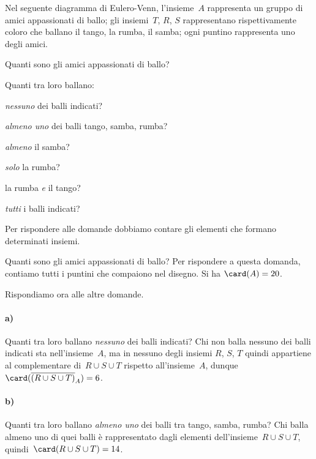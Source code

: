 \begin{exrig}
 \begin{esempio}
Nel seguente diagramma di Eulero-Venn, l'insieme~$A$ rappresenta un gruppo di amici appassionati di ballo; gli insiemi~$T$, $R$,
$S$ rappresentano rispettivamente coloro che ballano il tango, la rumba, il samba; ogni puntino rappresenta uno degli amici.
\begin{multicols}{2}
Quanti sono gli amici appassionati di ballo?

Quanti tra loro ballano:
\begin{enumeratea}
\item \emph{nessuno} dei balli indicati?
\item \emph{almeno uno} dei balli tango, samba, rumba?
\item \emph{almeno} il samba?
\item \emph{solo} la rumba?
\item la rumba \emph{e} il tango?
\item \emph{tutti} i balli indicati?
\end{enumeratea}
\begin{center}
 
\end{center}
\end{multicols}

Per rispondere alle domande dobbiamo contare gli elementi che formano determinati insiemi.

Quanti sono gli amici appassionati di ballo? Per rispondere a questa
domanda, contiamo tutti i puntini che compaiono nel disegno. Si ha 
$\card(A)=20$.

Rispondiamo ora alle altre domande.
\paragraph{a)} Quanti tra loro ballano \emph{nessuno} dei balli indicati?
Chi non balla nessuno dei balli indicati sta nell'insieme~$A$, ma in nessuno degli insiemi
$R$, $S$, $T$ quindi appartiene al complementare
di~$R\cup S\cup T$ rispetto all'insieme~$A$,
dunque~$\card(\overline{({R\cup S\cup T})}_{A})=6$.

\paragraph{b)} Quanti tra loro ballano \emph{almeno uno} dei balli tra tango, samba, rumba? Chi balla almeno uno di quei balli è rappresentato dagli elementi
dell'insieme~$R\cup S\cup T$, quindi~$\card(R\cup S\cup T)=14$.


\end{esempio}
\end{exrig}
